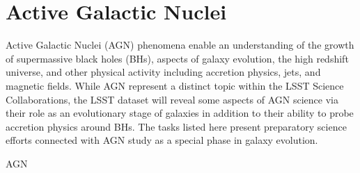\section{Active Galactic Nuclei}\label{sec:tasks:agn:intro} {\justify


Active Galactic Nuclei (AGN) phenomena enable an understanding of
the growth of supermassive black holes (BHs), aspects of galaxy evolution, the high redshift universe, 
and other physical activity including accretion physics, jets, and magnetic fields.  
While AGN represent a distinct topic within the LSST Science Collaborations, the LSST
dataset will reveal some aspects of AGN science via their role as an
evolutionary stage of galaxies in addition to their ability to probe accretion physics around BHs.
The tasks listed here present preparatory science efforts connected with AGN study as a special
phase in galaxy evolution.


\begin{tasklist}{AGN}

\end{tasklist}}
